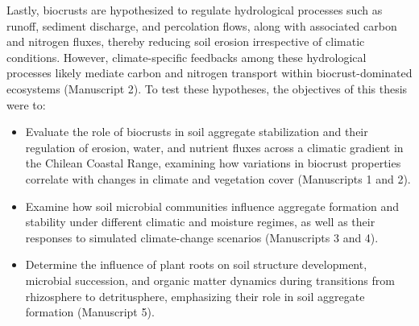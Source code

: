 Lastly, biocrusts are hypothesized to regulate hydrological processes such as runoff, sediment discharge, and percolation flows, along with associated carbon and nitrogen fluxes, thereby reducing soil erosion irrespective of climatic conditions. However, climate-specific feedbacks among these hydrological processes likely mediate carbon and nitrogen transport within biocrust-dominated ecosystems (Manuscript 2).
To test these hypotheses, the objectives of this thesis were to:
\begin{itemize}
  \item Evaluate the role of biocrusts in soil aggregate stabilization and their regulation of erosion, water, and nutrient fluxes across a climatic gradient in the Chilean Coastal Range, examining how variations in biocrust properties correlate with changes in climate and vegetation cover (Manuscripts 1 and 2).
  \item Examine how soil microbial communities influence aggregate formation and stability under different climatic and moisture regimes, as well as their responses to simulated climate-change scenarios (Manuscripts 3 and 4).
  \item Determine the influence of plant roots on soil structure development, microbial succession, and organic matter dynamics during transitions from rhizosphere to detritusphere, emphasizing their role in soil aggregate formation (Manuscript 5).
\end{itemize}